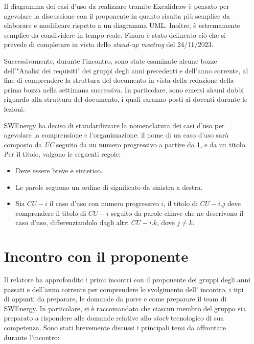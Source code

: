 Il diagramma dei casi d'uso da realizzare tramite Excalidraw è pensato per
agevolare la discussione con il proponente in quanto risulta più semplice da
elaborare e modificare rispetto a un diagramma UML. Inoltre, è estremamente
semplice da condividere in tempo reale. Finora è stato delineato ciò che si
prevede di completare in vista dello \textit{stand-up meeting} del 24/11/2023.

Successivamente, durante l'incontro, sono state esaminate alcune bozze
dell'"Analisi dei requisiti" dei gruppi degli anni precedenti e dell'anno
corrente,
al fine di comprendere la struttura del documento in vista della redazione
della prima bozza nella settimana successiva. In particolare, sono emersi
alcuni dubbi riguardo alla struttura del documento, i quali saranno posti ai
docenti durante le lezioni.

SWEnergy ha deciso di standardizzare la nomenclatura dei casi d'uso per
agevolare la comprensione e l'organizzazione: il nome di un caso d'uso sarà
composto da \textit{UC} seguito da un numero progressivo a partire da 1, e da
un titolo. Per il titolo, valgono le seguenti regole:

\begin{itemize}
	\item Deve essere breve e sintetico.
	\item Le parole seguono un ordine di significato da sinistra a destra.
	\item Sia $CU-i$ il caso d'uso con numero progressivo $i$, il titolo
	      di $CU-i.j$ deve comprendere il titolo di $CU-i$ seguito da parole
	      chiave che ne descrivono il caso d'uso, differenziandolo dagli altri
	      $CU-i.k$, dove $j \neq k$.
\end{itemize}

\section{Incontro con il proponente}

Il relatore ha approfondito i primi incontri con il proponente dei gruppi
degli anni passati e dell'anno corrente per comprendere lo svolgimento dell'
incontro, i tipi di appunti da preparare, le domande da porre e come preparare
il team di SWEnergy. In particolare, si è raccomandato che ciascun membro del
gruppo sia preparato a rispondere alle domande relative allo \textit{stack}
tecnologico di sua competenza. Sono stati brevemente discussi i principali
temi da affrontare durante l'incontro:

